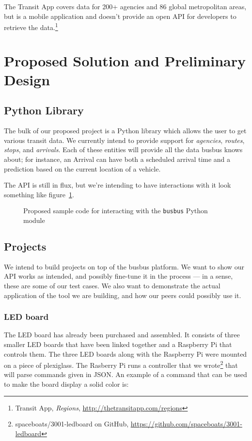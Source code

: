 \documentclass[12pt]{article}
\begin{document}
The Transit App covers data for 200+ agencies
and 86 global metropolitan areas, but is a mobile application and doesn't provide an open API for developers to retrieve the
data.\footnote{Transit App, \textit{Regions}, \url{http://thetransitapp.com/regions}}


\section{Proposed Solution and Preliminary Design}
\subsection{Python Library}
The bulk of our proposed project is a Python library which allows the user to get various transit data.
We currently intend to provide support for \textit{agencies}, \textit{routes}, \textit{stops}, and \textit{arrivals}.
Each of these entities will provide all the data busbus knows about; for instance, an Arrival can have both a scheduled arrival time
and a prediction based on the current location of a vehicle.

The API is still in flux, but we're intending to have interactions with it look something like figure~\ref{fig:pythonsample}.

\begin{figure}[h]
	\begin{center}
		
	\end{center}
	\caption{Proposed sample code for interacting with the \texttt{busbus} Python module}
	\label{fig:pythonsample}
\end{figure}

\subsection{Projects}
We intend to build projects on top of the busbus platform.
We want to show our API works as intended, and possibly
fine-tune it in the process --- in a sense, these are some of our test cases. We also want
to demonstrate the actual application of the tool we are building, and how our peers
could possibly use it.

\subsubsection{LED board}
The LED board has already been purchased and assembled. It consists of three smaller LED boards that have been linked together and a Raspberry Pi that controls them.
The three LED boards along with the Raspberry Pi were mounted on a piece of plexiglass.
The Rasberry Pi runs a controller that we wrote\footnote{spaceboats/3001-ledboard on GitHub, \url{https://github.com/spaceboats/3001-ledboard}}
that will parse commands given in JSON.
An example of a command that can be used to
make the board display a solid color is:
\end{document}
